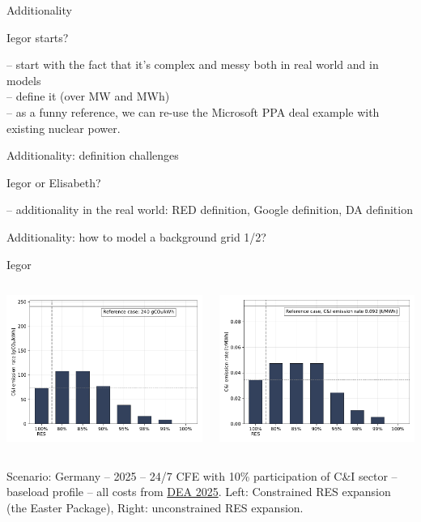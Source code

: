 \begin{frame}{Additionality}

  Iegor starts? 

  -- start with the fact that it's complex and messy both in real world and in models\\
  -- define it (over MW and MWh)\\
  -- as a funny reference, we can re-use the Microsoft PPA deal example with existing nuclear power.

\end{frame}


\begin{frame}{Additionality: definition challenges}

  Iegor or Elisabeth?

  -- additionality in the real world: RED definition, Google definition, DA definition\\

\end{frame}


\begin{frame}{Additionality: how to model a background grid 1/2?}

  Iegor

  \begin{columns}
    \begin{column}{7cm}
      \includegraphics[width=7.5cm]{images/10-2025-DE-p3-ci_emisrate.pdf}
    \end{column}
    \begin{column}{7cm}
      \includegraphics[width=7.5cm]{images/ci_emisrate.pdf}
    \end{column}
  \end{columns}

  Scenario: Germany -- 2025 -- 24/7 CFE with 10\% participation of C\&I sector -- baseload profile -- all costs from \href{https://ens.dk/en/our-services/technology-catalogues}{DEA 2025}. Left: Constrained RES expansion (the Easter Package), Right: unconstrained RES expansion.
\end{frame}


